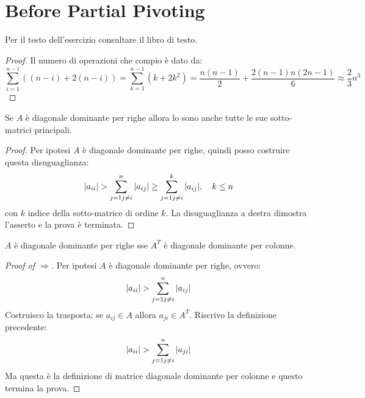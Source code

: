 \section{Before Partial Pivoting}

\begin{exercise}[3.6]
Per il testo dell'esercizio consultare il libro di testo.
\end{exercise}
\begin{proof}
Il numero di operazioni che compio \`e dato da:
\begin{displaymath}
\sum_{i = 1}^{n - i}{\left( (n-i) + 2(n-i) \right)} =
\sum_{k = 1}^{n - 1}{\left( k + 2k^{2} \right)} = \frac{n(n-1)}{2} +
\frac{2(n-1)n(2n-1)}{6} \approx \frac{2}{3}n^{3}
\end{displaymath}
\end{proof}

\begin{exercise}[3.9, Lemma 3.4]
Se $A$ \`e diagonale dominante per righe allora lo sono anche tutte le sue
sotto-matrici principali.
\end{exercise}
\begin{proof}
Per ipotesi $A$ \`e diagonale dominante per righe, quindi posso costruire questa 
disuguaglianza:
\begin{displaymath}
|a_{ii}| > \sum_{j = 1 \\j \not = i}^{n}{|a_{ij}|} \geq \sum_{j = 1 \\j \not =
i}^{k}{|a_{ij}|}, \quad k \leq n
\end{displaymath}
con $k$ indice della sotto-matrice di ordine $k$. La disuguaglianza a destra
dimostra l'asserto e la prova \`e terminata.
\end{proof}

\begin{exercise}[3.9, Lemma 3.5]
$A$ \`e diagonale dominante per righe sse $A^{T}$ \`e diagonale dominante per
colonne.
\end{exercise}
\begin{proof}[Proof of $\Rightarrow$]
Per ipotesi $A$ \`e diagonale dominante per righe, ovvero:
\begin{displaymath}
|a_{ii}| > \sum_{j = 1 \\j \not = i}^{n}{|a_{ij}|}
\end{displaymath}
Costruisco la trasposta: se $a_{ij} \in A$ allora $a_{ji} \in A^{T}$. Riscrivo
la definizione precedente:
\begin{displaymath}
|a_{ii}| > \sum_{j = 1 \\j \not = i}^{n}{|a_{ji}|}
\end{displaymath}
Ma questa \`e la definizione di matrice diagonale dominante per colonne e questo
termina la prova.
\end{proof}

